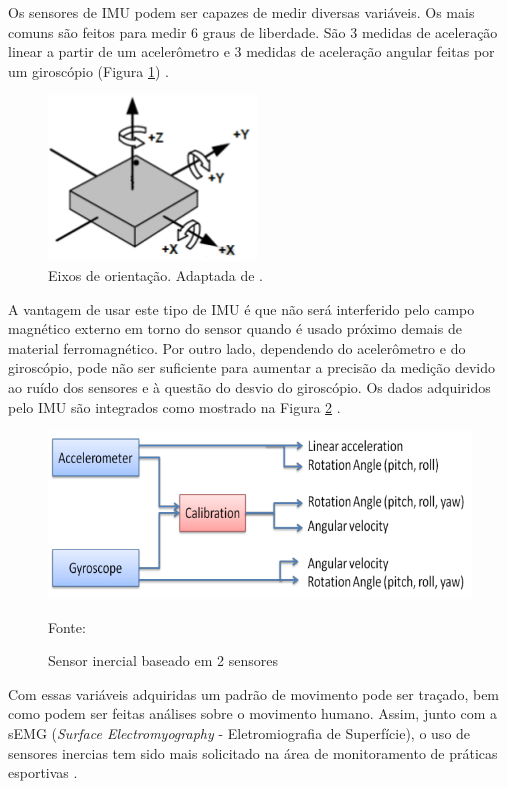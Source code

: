 		Os sensores de IMU podem ser capazes de medir diversas variáveis. Os mais comuns são feitos para medir 6 graus de liberdade. São 3 medidas de aceleração linear a partir de um acelerômetro e 3 medidas de aceleração angular feitas por um giroscópio (Figura \ref{eixos_imu}) \cite{santos2016}.
		 
		\begin{figure}[h!]
			\centering
			\includegraphics[keepaspectratio=true,scale=0.8]{figuras/Eixos_imu.png}
			\caption{Eixos de orientação. Adaptada de .}
			\label{eixos_imu}	
		\end{figure}


		A vantagem de usar este tipo de IMU é que não será interferido pelo campo magnético externo em torno do
		sensor quando é usado próximo demais de material ferromagnético. Por outro lado, dependendo do acelerômetro e do giroscópio, pode não ser suficiente para aumentar a precisão da medição devido ao ruído dos sensores e à questão do desvio do giroscópio. Os dados adquiridos pelo IMU são integrados como mostrado na Figura \ref{integracao_imu} \cite{ahmad2013}.

		\begin{figure}[h!]
			\centering
			\includegraphics[keepaspectratio=true,scale=0.5
			]{figuras/integracao_imu.png}
			\caption{Sensor inercial baseado em 2 sensores}
			Fonte: \cite{ahmad2013}
			\label{integracao_imu}
			
		\end{figure}

		Com essas variáveis adquiridas um padrão de movimento pode ser traçado, bem como podem ser feitas análises sobre o movimento humano. Assim, junto com a sEMG (\textit{Surface Electromyography} - Eletromiografia de Superfície), o uso de sensores inercias tem sido mais solicitado na área de monitoramento de práticas esportivas \cite{howard2016}.
		
